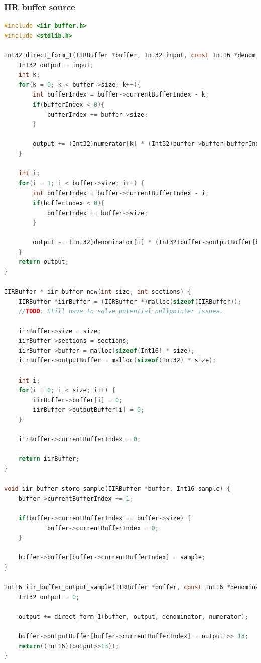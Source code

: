 \documentclass[11pt,a4paper]{article}
\begin{document}
	\subsubsection{IIR buffer source}
	\begin{lstlisting}[language=c]
#include <iir_buffer.h>
#include <stdlib.h>

Int32 direct_form_1(IIRBuffer *buffer, Int32 input, const Int16 *denominator, const Int16 *numerator) {
	Int32 output = input;
	int k;
	for(k = 0; k < buffer->size; k++){
		int bufferIndex = buffer->currentBufferIndex - k;
		if(bufferIndex < 0){
			bufferIndex += buffer->size;
		}

		output += (Int32)numerator[k] * (Int32)buffer->buffer[bufferIndex];
	}

	int i;
	for(i = 1; i < buffer->size; i++) {
		int bufferIndex = buffer->currentBufferIndex - i;
		if(bufferIndex < 0){
			bufferIndex += buffer->size;
		}

		output -= (Int32)denominator[i] * (Int32)buffer->outputBuffer[bufferIndex];
	}
	return output;
}

IIRBuffer * iir_buffer_new(int size, int sections) {
	IIRBuffer *iirBuffer = (IIRBuffer *)malloc(sizeof(IIRBuffer));
	//TODO: Still have to solve potential nullpointer issues.

	iirBuffer->size = size;
	iirBuffer->sections = sections;
	iirBuffer->buffer = malloc(sizeof(Int16) * size);
	iirBuffer->outputBuffer = malloc(sizeof(Int32) * size);

	int i;
	for(i = 0; i < size; i++) {
		iirBuffer->buffer[i] = 0;
		iirBuffer->outputBuffer[i] = 0;
	}

	iirBuffer->currentBufferIndex = 0;

	return iirBuffer;
}

void iir_buffer_store_sample(IIRBuffer *buffer, Int16 sample) {
	buffer->currentBufferIndex += 1;

	if(buffer->currentBufferIndex == buffer->size) {
			buffer->currentBufferIndex = 0;
	}

	buffer->buffer[buffer->currentBufferIndex] = sample;
}

Int16 iir_buffer_output_sample(IIRBuffer *buffer, const Int16 *denominator, const Int16 *numerator) {
	Int32 output = 0;

	output += direct_form_1(buffer, output, denominator, numerator);

	buffer->outputBuffer[buffer->currentBufferIndex] = output >> 13;
	return((Int16)(output>>13));
}
	\end{lstlisting}
	\clearpage
	
\end{document}
